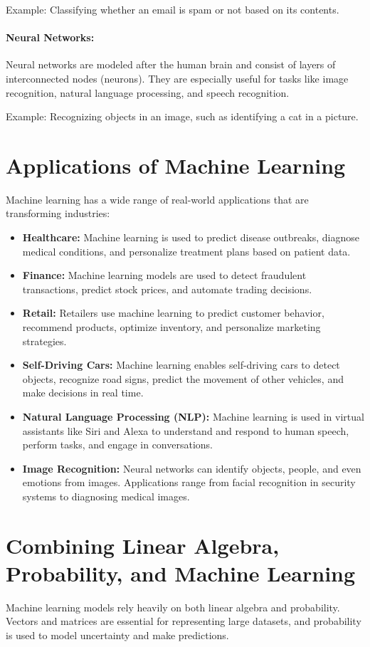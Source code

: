 Example: Classifying whether an email is spam or not based on its contents.

\paragraph{Neural Networks:} Neural networks are modeled after the human brain and consist of layers of interconnected nodes (neurons). They are especially useful for tasks like image recognition, natural language processing, and speech recognition.

Example: Recognizing objects in an image, such as identifying a cat in a picture.

\section{Applications of Machine Learning}
Machine learning has a wide range of real-world applications that are transforming industries:
\begin{itemize}
    \item \textbf{Healthcare:} Machine learning is used to predict disease outbreaks, diagnose medical conditions, and personalize treatment plans based on patient data.
    \item \textbf{Finance:} Machine learning models are used to detect fraudulent transactions, predict stock prices, and automate trading decisions.
    \item \textbf{Retail:} Retailers use machine learning to predict customer behavior, recommend products, optimize inventory, and personalize marketing strategies.
    \item \textbf{Self-Driving Cars:} Machine learning enables self-driving cars to detect objects, recognize road signs, predict the movement of other vehicles, and make decisions in real time.
    \item \textbf{Natural Language Processing (NLP):} Machine learning is used in virtual assistants like Siri and Alexa to understand and respond to human speech, perform tasks, and engage in conversations.
    \item \textbf{Image Recognition:} Neural networks can identify objects, people, and even emotions from images. Applications range from facial recognition in security systems to diagnosing medical images.
\end{itemize}

\section{Combining Linear Algebra, Probability, and Machine Learning}
Machine learning models rely heavily on both linear algebra and probability. Vectors and matrices are essential for representing large datasets, and probability is used to model uncertainty and make predictions.

